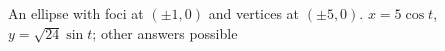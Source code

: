 {An ellipse with foci at $(\pm 1,0)$ and vertices at $(\pm 5,0)$.
}
{$x=5\cos t$, $y=\sqrt{24}\sin t$; other answers possible
}